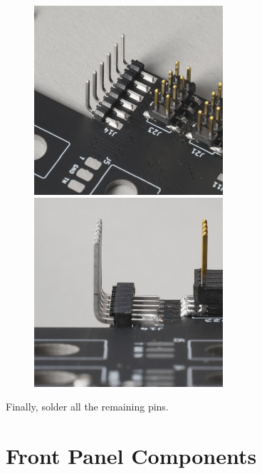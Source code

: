 \documentclass[12pt, a4paper]{article}
\begin{document}
\begin{figure}[H]
    \centering
    \includegraphics[width=7cm]{images/22_04_one_pin_soldered.jpg}
    \hspace{2mm}
    \includegraphics[width=7cm]{images/22_05_soldered_sideview.jpg}
\end{figure}

Finally, solder all the remaining pins.

\pagebreak
\section{Front Panel Components}
\end{document}
